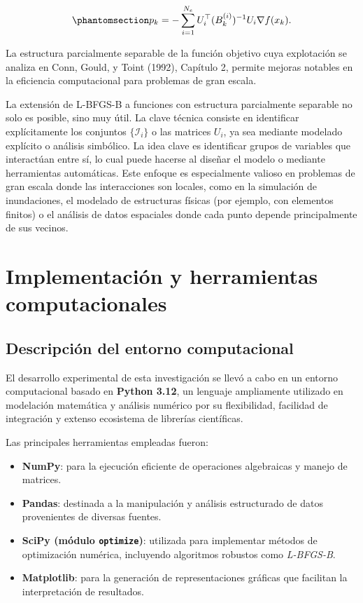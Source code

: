 \documentclass[
  spanish,
  us-letterpaper,
]{scrreprt}
\providecommand{\tightlist}{%
  \setlength{\itemsep}{0pt}\setlength{\parskip}{0pt}}
\numberwithin{equation}{section}
\begin{document}
\begin{equation}\phantomsection\label{eq-145}{
p_k = -\sum_{i=1}^{N_e} U_i^\top (B_k^{(i)})^{-1} U_i \nabla f(x_k).
}\end{equation}

La estructura parcialmente separable de la función objetivo cuya
explotación se analiza en Conn, Gould, y Toint (1992), Capítulo 2,
permite mejoras notables en la eficiencia computacional para problemas
de gran escala.

La extensión de L-BFGS-B a funciones con estructura parcialmente
separable no solo es posible, sino muy útil. La clave técnica consiste
en identificar explícitamente los conjuntos \(\{\mathcal{I}_i\}\) o las
matrices \(U_i\), ya sea mediante modelado explícito o análisis
simbólico. La idea clave es identificar grupos de variables que
interactúan entre sí, lo cual puede hacerse al diseñar el modelo o
mediante herramientas automáticas. Este enfoque es especialmente valioso
en problemas de gran escala donde las interacciones son locales, como en
la simulación de inundaciones, el modelado de estructuras físicas (por
ejemplo, con elementos finitos) o el análisis de datos espaciales donde
cada punto depende principalmente de sus vecinos.


\chapter{Implementación y herramientas
computacionales}\label{implementaciuxf3n-y-herramientas-computacionales}

\section{Descripción del entorno
computacional}\label{descripciuxf3n-del-entorno-computacional}

El desarrollo experimental de esta investigación se llevó a cabo en un
entorno computacional basado en \textbf{Python 3.12}, un lenguaje
ampliamente utilizado en modelación matemática y análisis numérico por
su flexibilidad, facilidad de integración y extenso ecosistema de
librerías científicas.

Las principales herramientas empleadas fueron:

\begin{itemize}
\tightlist
\item
  \textbf{NumPy}: para la ejecución eficiente de operaciones algebraicas
  y manejo de matrices.\\
\item
  \textbf{Pandas}: destinada a la manipulación y análisis estructurado
  de datos provenientes de diversas fuentes.\\
\item
  \textbf{SciPy (módulo \texttt{optimize})}: utilizada para implementar
  métodos de optimización numérica, incluyendo algoritmos robustos como
  \emph{L-BFGS-B}.\\
\item
  \textbf{Matplotlib}: para la generación de representaciones gráficas
  que facilitan la interpretación de resultados.
\end{itemize}
\end{document}
